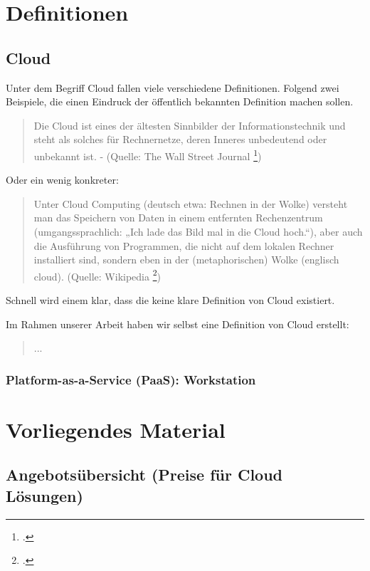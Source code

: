 \section{Definitionen}

\subsection{Cloud}

Unter dem Begriff Cloud fallen viele verschiedene Definitionen. Folgend zwei Beispiele, die einen Eindruck der öffentlich bekannten Definition machen sollen.

\begin{quote}
	Die Cloud ist eines der ältesten Sinnbilder der Informationstechnik und steht als solches für Rechnernetze, deren Inneres unbedeutend oder unbekannt ist. - (Quelle: The Wall Street Journal \footcite{The_Internet_Industry_Is_on_a_Cloud_--_Whatever_That_May_Mean_-_WSJ_2014-10-03})
\end{quote}

Oder ein wenig konkreter:

\begin{quote}
	Unter Cloud Computing (deutsch etwa: Rechnen in der Wolke) versteht man das Speichern von Daten in einem entfernten Rechenzentrum (umgangssprachlich: „Ich lade das Bild mal in die Cloud hoch.“), aber auch die Ausführung von Programmen, die nicht auf dem lokalen Rechner installiert sind, sondern eben in der (metaphorischen) Wolke (englisch cloud). (Quelle: Wikipedia \footcite{Cloud_Computing__Wikipedia_2014-10-03})
\end{quote}

Schnell wird einem klar, dass die keine klare Definition von Cloud existiert.

Im Rahmen unserer Arbeit haben wir selbst eine Definition von Cloud erstellt:
\begin{quote}
	...
\end{quote}







\subsubsection{Platform-as-a-Service (PaaS): Workstation}

\section{Vorliegendes Material}

\subsection{Angebotsübersicht (Preise für Cloud Lösungen)}
